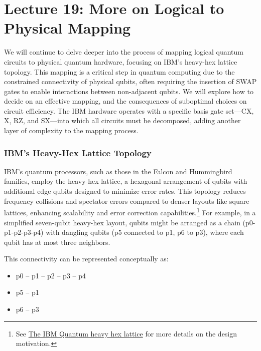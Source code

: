 \section{Lecture 19: More on Logical to Physical Mapping}\label{sec:lecture19}

We will continue to delve deeper into the process of mapping logical quantum
circuits to physical quantum hardware, focusing on IBM's heavy-hex lattice
topology. This mapping is a critical step in quantum computing due to the
constrained connectivity of physical qubits, often requiring the insertion of
SWAP gates to enable interactions between non-adjacent qubits. We will
explore how to decide on an effective mapping, and the consequences of
suboptimal choices on circuit efficiency. The IBM hardware operates with a
specific basis gate set—CX, X, RZ, and SX—into which all circuits must be
decomposed, adding another layer of complexity to the mapping process.

\subsubsection*{IBM's Heavy-Hex Lattice Topology}

IBM's quantum processors, such as those in the Falcon and Hummingbird
families, employ the heavy-hex lattice, a hexagonal arrangement of qubits
with additional edge qubits designed to minimize error rates. This topology
reduces frequency collisions and spectator errors compared to denser layouts
like square lattices, enhancing scalability and error correction
capabilities.\footnote{See \href{https://www.ibm.com/quantum/blog/heavy-hex-lattice}
{The IBM Quantum heavy hex lattice} for more details on the design motivation.}
For example, in a simplified seven-qubit heavy-hex layout, qubits might be
arranged as a chain (p0-p1-p2-p3-p4) with dangling qubits (p5 connected to
p1, p6 to p3), where each qubit has at most three neighbors.

\vspace{0.3cm}

\noindent
This connectivity can be represented conceptually as:

\begin{itemize}
  \item p0 -- p1 -- p2 -- p3 -- p4
  \item p5 -- p1
  \item p6 -- p3
\end{itemize}

\vspace{0.3cm}

